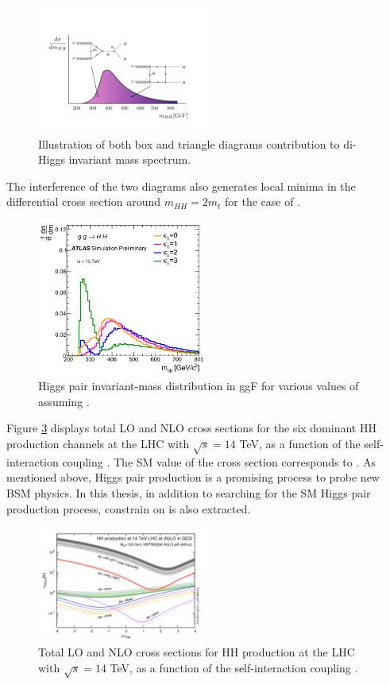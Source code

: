 \begin{figure}[H]
    \centering
    \includegraphics[width=0.5\textwidth]{Ch1/Img/illustration_mHH.jpeg}
    \caption{Illustration of both box and triangle diagrams contribution to di-Higgs invariant mass spectrum.}
    \label{fig:chap1:HH:BSM:I}
\end{figure}
The interference of the two diagrams also generates local minima in the differential cross section around $m_{HH}=2m_t$ for the case of .
\begin{figure}[H]
    \centering
    \includegraphics[width=0.5\textwidth]{Ch1/Img/mHH.png}
    \caption{Higgs pair invariant-mass distribution in ggF for various values of \kl assuming .}
    \label{fig:chap1:HH:BSM:MHH}
\end{figure}

Figure \ref{fig:chap1:HH:BSM:XSEC:L} displays total LO and NLO cross sections for the six dominant HH production channels at the LHC with $\sqrt{s}=14$ TeV, as a function of the self-interaction coupling \kl. The SM value of the cross section corresponds to . As mentioned above, Higgs pair production is a promising process to probe new BSM physics. In this thesis, in addition to searching for the SM Higgs pair production process, constrain on \kl is also extracted.
\begin{figure}[H]
    \centering
    \includegraphics[width=0.5\textwidth]{Ch1/Img/HH_Xsec_as_lambda.png}
    \caption{Total LO and NLO cross sections for HH production at the LHC with $\sqrt{s}=14$ TeV, as a function of the self-interaction coupling \kl.}
    \label{fig:chap1:HH:BSM:XSEC:L}
\end{figure}

